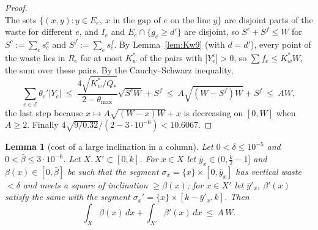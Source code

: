 \documentclass[11pt]{amsart}
\newtheorem{lemma}[theorem]{Lemma}
\theoremstyle{definition}
\theoremstyle{remark}
\begin{document}
\begin{proof}
\[\]
The sets $\{(x,y):y\in E_e,\ x\text{ in the gap of }e\text{ on the line }y\}$ are disjoint parts of the waste for different
$e$, and $I_e$ and $E_e\cap\{g_e\ge d'\}$ are disjoint, so $S^c+S^f\le W$ for $S^c:=\sum_es_e^c$ and $S^f:=\sum_es_e^f$. By
Lemma~\ref{lem:Kw9} (with $d=d'$), every point of the waste lies in $R_e$ for at most $K_w^*$ of the pairs with $|Y_e^c|>0$, so
$\sum f_e\le K_w^*W$, the sum over these pairs. By the Cauchy--Schwarz inequality,
\[
\sum_{e\in\mathcal E}\theta_e'|Y_e|\ \le\ \frac{4\sqrt{K_w^*/Q_*}}{2-\theta_{\max}}\sqrt{S^cW}+S^f\ \le\ A\sqrt{(W-S^f)W}+S^f\ \le\ AW,
\]
the last step because $x\mapsto A\sqrt{(W-x)W}+x$ is decreasing on $[0,W]$ when $A\ge2$. Finally $4\sqrt{9/0.32}/(2-3\cdot10^{-6})<10.6067$.
\end{proof}

\begin{lemma}[cost of a large inclination in a column]\label{lem:Bv}
Let $0<\delta\le10^{-5}$ and $0<\bar\beta\le3\cdot10^{-6}$. Let $X,X'\subset[0,k]$. For $x\in X$ let $\bar y_x\in(0,\frac k2-1]$ and
$\beta(x)\in[0,\bar\beta]$ be such that the segment $\sigma_x=\{x\}\times[0,\bar y_x]$ has vertical waste $<\delta$ and meets a square of
inclination $\ge\beta(x)$; for $x\in X'$ let $\bar y'_x$, $\beta'(x)$ satisfy the same with the segment
$\sigma_x'=\{x\}\times[k-\bar y'_x,k]$. Then
\[
\int_X\beta(x)\,dx+\int_{X'}\beta'(x)\,dx\ \le\ A\,W .
\]
\end{lemma}
\end{document}

